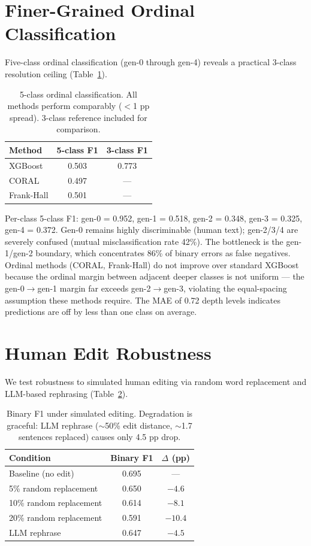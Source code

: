 \documentclass[11pt,twocolumn]{article}
\begin{document}
\section{Finer-Grained Ordinal Classification}
\label{sec:ordinal}

Five-class ordinal classification (gen-0 through gen-4) reveals a practical 3-class resolution ceiling (Table~\ref{tab:ordinal}).

\begin{table}[h]
\centering
\small
\begin{tabular}{lcc}
\toprule
\textbf{Method} & \textbf{5-class F1} & \textbf{3-class F1} \\
\midrule
XGBoost & 0.503 & 0.773 \\
CORAL & 0.497 & --- \\
Frank-Hall & 0.501 & --- \\
\bottomrule
\end{tabular}
\caption{5-class ordinal classification. All methods perform comparably ($<$1 pp spread). 3-class reference included for comparison.}
\label{tab:ordinal}
\end{table}

Per-class 5-class F1: gen-0 = 0.952, gen-1 = 0.518, gen-2 = 0.348, gen-3 = 0.325, gen-4 = 0.372.
Gen-0 remains highly discriminable (human text); gen-2/3/4 are severely confused (mutual misclassification rate 42\%).
The bottleneck is the gen-1/gen-2 boundary, which concentrates 86\% of binary errors as false negatives.
Ordinal methods (CORAL, Frank-Hall) do not improve over standard XGBoost because the ordinal margin between adjacent deeper classes is not uniform --- the gen-0$\to$gen-1 margin far exceeds gen-2$\to$gen-3, violating the equal-spacing assumption these methods require.
The MAE of 0.72 depth levels indicates predictions are off by less than one class on average.


\section{Human Edit Robustness}
\label{sec:edit}

We test robustness to simulated human editing via random word replacement and LLM-based rephrasing (Table~\ref{tab:edit}).

\begin{table}[h]
\centering
\small
\begin{tabular}{lcc}
\toprule
\textbf{Condition} & \textbf{Binary F1} & \textbf{$\Delta$ (pp)} \\
\midrule
Baseline (no edit) & 0.695 & --- \\
5\% random replacement & 0.650 & $-4.6$ \\
10\% random replacement & 0.614 & $-8.1$ \\
20\% random replacement & 0.591 & $-10.4$ \\
LLM rephrase & 0.647 & $-4.5$ \\
\bottomrule
\end{tabular}
\caption{Binary F1 under simulated editing. Degradation is graceful: LLM rephrase ($\sim$50\% edit distance, $\sim$1.7 sentences replaced) causes only 4.5 pp drop.}
\label{tab:edit}
\end{table}
\end{document}

